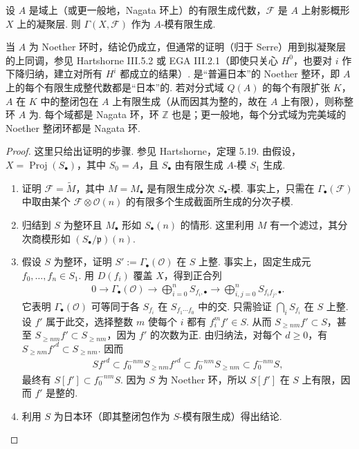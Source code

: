 \begin{theorem}\label{item:ag-2-1-11}
设 $A$ 是域上（或更一般地，Nagata 环上）的有限生成代数，$\mathcal F$ 是 $A$ 上射影概形 $X$ 上的凝聚层. 则 $\Gamma(X,\mathcal F)$ 作为 $A$-模有限生成.
\end{theorem}
当 $A$ 为 Noether 环时，结论仍成立，但通常的证明（归于 Serre）用到拟凝聚层的上同调，参见 Hartshorne III.5.2 或 EGA III.2.1（即使只关心 $H^0$，也要对 $i$ 作下降归纳，建立对所有 $H^i$ 都成立的结果）.
是``普遍日本''的 Noether 整环，即 $A$ 上的每个有限生成整代数都是``日本''的. 若对分式域 $Q(A)$ 的每个有限扩张 $K$，$A$ 在 $K$ 中的整闭包在 $A$ 上有限生成（从而因其为整的，故在 $A$ 上有限），则称整环 $A$ 为. 每个域都是 Nagata 环，环 $\mathbb Z$ 也是；更一般地，每个分式域为完美域的 Noether 整闭环都是 Nagata 环.
\begin{proof}
这里只给出证明的步骤. 参见 Hartshorne，定理 5.19. 由假设，$X=\operatorname{Proj}(S_\bullet)$，其中 $S_0=A$，且 $S_\bullet$ 由有限生成 $A$-模 $S_1$ 生成.
\begin{enumerate}[label=\arabic*-]
\item 证明 $\mathcal F=\widetilde M$，其中 $M=M_\bullet$ 是有限生成分次 $S_\bullet$-模. 事实上，只需在 $\Gamma_\bullet(\mathcal F)$ 中取由某个 $\mathcal F\otimes\mathcal O(n)$ 的有限多个生成截面所生成的分次子模.
\item 归结到 $S$ 为整环且 $M_\bullet$ 形如 $S_\bullet(n)$ 的情形. 这里利用 $M$ 有一个滤过，其分次商模形如 $(S_\bullet/\mathfrak p)(n)$.
\item 假设 $S$ 为整环，证明 $S':=\Gamma_\bullet(\mathcal O)$ 在 $S$ 上整. 事实上，固定生成元 $f_0,\ldots,f_n\in S_1$. 用 $D(f_i)$ 覆盖 $X$，得到正合列
\begin{align*}
0\longrightarrow\Gamma_\bullet(\mathcal O)\longrightarrow\bigoplus_{i=0}^nS_{f_i,\bullet}\longrightarrow\bigoplus_{i,j=0}^nS_{f_if_j,\bullet}.
\end{align*}
它表明 $\Gamma_\bullet(\mathcal O)$ 可等同于各 $S_{f_i}$ 在 $S_{f_1\cdots f_0}$ 中的交. 只需验证 $\bigcap_iS_{f_i}$ 在 $S$ 上整. 设 $f'$ 属于此交，选择整数 $m$ 使每个 $i$ 都有 $f_i^mf'\in S$. 从而 $S_{\geqslant nm}f'\subset S$，甚至 $S_{\geqslant nm}f'\subset S_{\geqslant nm}$，因为 $f'$ 的次数为正. 由归纳法，对每个 $d\geqslant0$，有 $S_{\geqslant nm}f'^d\subset S_{\geqslant nm}$. 因而
\begin{align*}
Sf'^d\subset f_0^{-nm}S_{\geqslant nm}f'^d\subset f_0^{-nm}S_{\geqslant nm}\subset f_0^{-nm}S,
\end{align*}
最终有 $S[f']\subset f_0^{-nm}S$. 因为 $S$ 为 Noether 环，所以 $S[f']$ 在 $S$ 上有限，因而 $f'$ 是整的.
\item 利用 $S$ 为日本环（即其整闭包作为 $S$-模有限生成）得出结论.\qedhere
\end{enumerate}
\end{proof}

